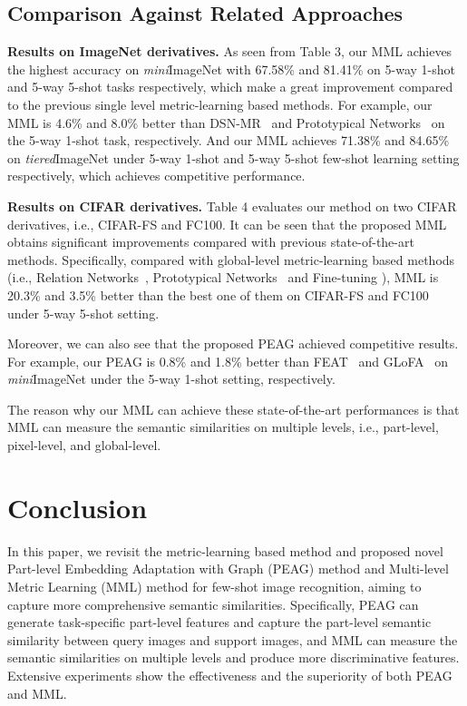 \documentclass{article}
\begin{document}
\subsection{Comparison Against Related Approaches}
\textbf{Results on ImageNet derivatives.} 
As seen from Table 3, our MML achieves the highest accuracy on \emph{mini}ImageNet with 67.58\% and 81.41\% on 5-way 1-shot and 5-way 5-shot tasks respectively, which make a great improvement compared to the previous single level metric-learning based methods. For example, our MML is 4.6\% and 8.0\% better than DSN-MR~\cite{simon2020adaptive} and Prototypical Networks~\cite{snell2017prototypical} on the 5-way 1-shot task, respectively. And our MML achieves 71.38\% and 84.65\% on \emph{tiered}ImageNet under 5-way 1-shot and 5-way 5-shot few-shot learning setting respectively, which achieves competitive performance.

\textbf{Results on CIFAR derivatives.}
Table 4 evaluates our method on two CIFAR derivatives, i.e., CIFAR-FS and FC100. It can be seen that the proposed MML obtains significant improvements compared with previous state-of-the-art methods. Specifically, compared with global-level metric-learning based methods (i.e., Relation Networks~\cite{sung2018learning}, Prototypical Networks~\cite{snell2017prototypical} and Fine-tuning \cite{dhillon2019baseline}), MML is 20.3\% and 3.5\% better than the best one of them on CIFAR-FS and FC100 under 5-way 5-shot setting.

Moreover, we can also see that the proposed PEAG achieved competitive results. For example, our PEAG is 0.8\% and 1.8\% better than FEAT~\cite{feat} and GLoFA~\cite{glofa} on \emph{mini}ImageNet under the 5-way 1-shot setting, respectively.

The reason why our MML can achieve these state-of-the-art performances is that MML can measure the semantic similarities on multiple levels, i.e., part-level, pixel-level, and global-level.

\section{Conclusion}
In this paper, we revisit the metric-learning based method and proposed novel Part-level Embedding Adaptation with Graph (PEAG) method and Multi-level Metric Learning (MML) method for few-shot image recognition, aiming to capture more comprehensive semantic similarities. Specifically, PEAG can generate task-specific part-level features and capture the part-level semantic similarity between query images and support images, and MML can measure the semantic similarities on multiple levels and produce more discriminative features. Extensive experiments show the effectiveness and the superiority of both PEAG and MML.



\end{document}
